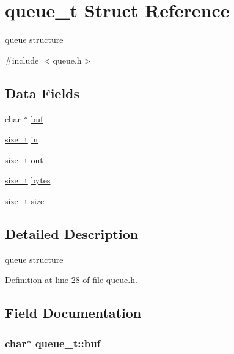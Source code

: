 \hypertarget{structqueue__t}{\section{queue\-\_\-t Struct Reference}
\label{structqueue__t}
}


queue structure  




{\ttfamily \#include $<$queue.\-h$>$}

\subsection*{Data Fields}
\begin{DoxyCompactItemize}
\item 
char $\ast$ \hyperlink{structqueue__t_aaee81421d150a17123a2b858d5b1685d}{buf}
\item 
\hyperlink{user__config_8h_aea0c7eab1ce1eebb4e879ef4e23c16ee}{size\-\_\-t} \hyperlink{structqueue__t_a7a6832e36c70a1db7fddc93fb6be9d63}{in}
\item 
\hyperlink{user__config_8h_aea0c7eab1ce1eebb4e879ef4e23c16ee}{size\-\_\-t} \hyperlink{structqueue__t_a8f6e1c623d2ceed398a71a0aab93b0fa}{out}
\item 
\hyperlink{user__config_8h_aea0c7eab1ce1eebb4e879ef4e23c16ee}{size\-\_\-t} \hyperlink{structqueue__t_a58398d4ee60bc90ffba2bc3488fe185b}{bytes}
\item 
\hyperlink{user__config_8h_aea0c7eab1ce1eebb4e879ef4e23c16ee}{size\-\_\-t} \hyperlink{structqueue__t_a83a13b888f9d4ef127d706559818b779}{size}
\end{DoxyCompactItemize}


\subsection{Detailed Description}
queue structure 

Definition at line 28 of file queue.\-h.



\subsection{Field Documentation}
\hypertarget{structqueue__t_aaee81421d150a17123a2b858d5b1685d}{
\subsubsection[{buf}]{\setlength{\rightskip}{0pt plus 5cm}char$\ast$ queue\-\_\-t\-::buf}}\label{structqueue__t_aaee81421d150a17123a2b858d5b1685d}



